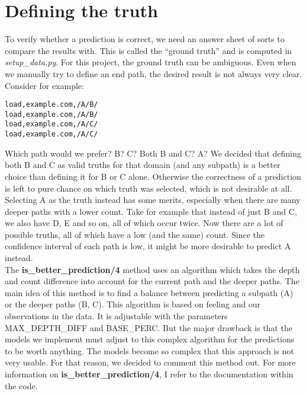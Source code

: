 \section{Defining the truth}\label{sec:truth}

To verify whether a prediction is correct, we need an answer sheet of sorts to compare the results with. This is called the ``ground truth'' and is computed in \textit{setup\_data.py}. For this project, the ground truth can be ambiguous. Even when we manually try to define an end path, the desired result is not always very clear. Consider for example:
\begin{lstlisting}
load,example.com,/A/B/
load,example.com,/A/B/
load,example.com,/A/C/
load,example.com,/A/C/
\end{lstlisting}
Which path would we prefer? B? C? Both B and C? A? We decided that defining both B and C as valid truths for that domain (and any subpath) is a better choice than defining it for B or C alone. Otherwise the correctness of a prediction is left to pure chance on which truth was selected, which is not desirable at all. Selecting A as the truth instead has some merits, especially when there are many deeper paths with a lower count. Take for example that instead of just B and C, we also have D, E and so on, all of which occur twice. Now there are a lot of possible truths, all of which have a low (and the same) count. Since the confidence interval of each path is low, it might be more desirable to predict A instead. 
\\[2ex]
The \textbf{is\_better\_prediction/4} method uses an algorithm which takes the depth and count difference into account for the current path and the deeper paths. The main idea of this method is to find a balance between predicting a subpath (A) or the deeper paths (B, C). This algorithm is based on feeling and our observations in the data. It is adjustable with the parameters MAX\_DEPTH\_DIFF and BASE\_PERC. But the major drawback is that the models we implement must adjust to this complex algorithm for the predictions to be worth anything. The models become so complex that this approach is not very usable. For that reason, we decided to comment this method out. For more information on \textbf{is\_better\_prediction/4}, I refer to the documentation within the code.
\\[2ex]
